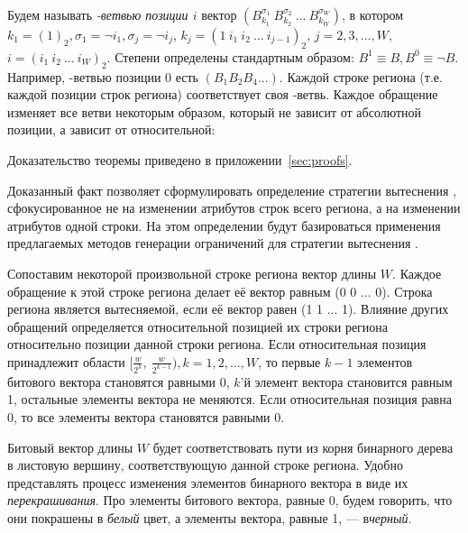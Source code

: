 Будем называть \emph{\PseudoLRU-ветвью позиции $i$} вектор
$(B_{k_1}^{\sigma_1}~B_{k_2}^{\sigma_2}~\dots~B_{k_W}^{\sigma_W})$,
в котором $k_1 = (1)_2, \sigma_1 = \neg i_1, \sigma_j = \neg i_j$, $k_j = (1~i_1~i_2~\dots~i_{j-1})_2$, $j = 2, 3, \dots, W$, $i = (i_1~i_2~\dots~i_W)_2$. Степени определены стандартным образом: $B^1 \equiv B, B^0 \equiv \neg B$. Например, \PseudoLRU-ветвью позиции 0 есть $(B_1 B_2 B_4 ...)$. Каждой строке региона (т.е. каждой позиции строк региона) соответствует своя \PseudoLRU-ветвь. Каждое обращение изменяет все ветви некоторым образом, который не зависит от абсолютной позиции, а зависит от относительной:

\begin{theorem}\label{thm_pseudoLRU_invariant} \PseudoLRUInvariant
\end{theorem}
Доказательство теоремы приведено в приложении~\ref{sec:proofs}.

Доказанный факт позволяет сформулировать определение стратегии
вытеснения \PseudoLRU, сфокусированное не на изменении атрибутов строк всего
региона,
а на изменении атрибутов одной строки. На этом определении
будут базироваться применения предлагаемых методов генерации
ограничений для стратегии вытеснения \PseudoLRU.

\begin{utv}
Сопоставим некоторой произвольной строке региона вектор длины $W$. Каждое обращение к этой строке региона делает её вектор равным (0 0 ... 0). Строка региона является вытесняемой, если её вектор равен (1 1 ... 1).
Влияние других обращений определяется относительной позицией их
строки региона относительно позиции данной строки региона. Если относительная позиция
принадлежит области $[\frac{w}{2^k},~\frac{w}{2^{k-1}}), k =
1,2,...,W$, то первые $k{-}1$ элементов битового вектора становятся равными
0, $k$'й элемент вектора становится равным 1, остальные элементы
вектора не меняются. Если относительная позиция равна 0, то все элементы вектора становятся равными 0.
\end{utv}

Битовый вектор длины $W$ будет соответствовать пути из корня бинарного
дерева в листовую вершину, соответствующую данной строке региона.
Удобно представлять процесс изменения элементов бинарного вектора  в виде их
\emph{перекрашивания}. Про элементы битового вектора, равные 0,
будем говорить, что они покрашены в \emph{белый} цвет, а элементы вектора, равные 1, --- в\emph{черный}.

